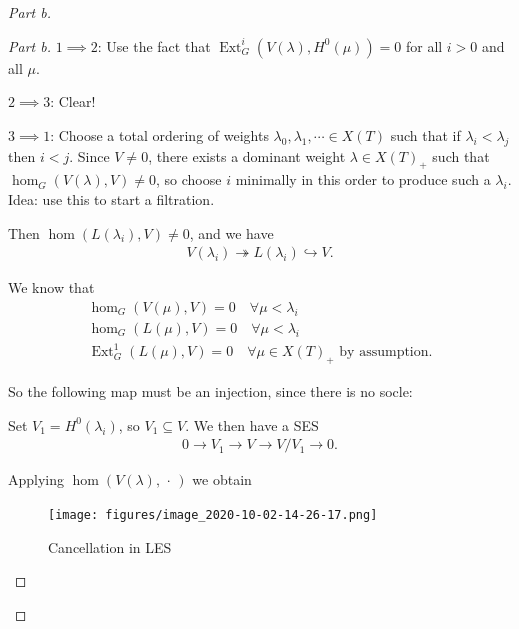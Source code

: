 \begin{proof}[Part b]

\begin{proof}[Part b]

\(1\implies 2\): Use the fact that
\(\operatorname{Ext}^i_G(V(\lambda), H^0(\mu)) = 0\) for all \(i>0\) and
all \(\mu\).

\(2\implies 3\): Clear!

\(3\implies 1\): Choose a total ordering of weights
\(\lambda_0, \lambda_1, \cdots \in X(T)\) such that if
\(\lambda_i < \lambda_j\) then \(i<j\). Since \(V\neq 0\), there exists
a dominant weight \(\lambda \in X(T)_+\) such that
\(\hom_G(V(\lambda), V) \neq 0\), so choose \(i\) minimally in this
order to produce such a \(\lambda_i\). Idea: use this to start a
filtration.

Then \(\hom(L(\lambda_i), V) \neq 0\), and we have
\begin{align*}   V(\lambda_i) \twoheadrightarrow L(\lambda_i) \hookrightarrow V .\end{align*}

We know that
\begin{align*}   \hom_G(V(\mu), V) = 0 \quad \forall \mu < \lambda_i \\ \hom_G(L(\mu), V) = 0 \quad \forall \mu < \lambda_i \\ \operatorname{Ext}_G^1(L(\mu), V) = 0 \quad \forall \mu \in X(T)_+ \text{ by assumption} .\end{align*}

So the following map must be an injection, since there is no socle:

\begin{center}
\end{center}

Set \(V_1 = H^0(\lambda_i)\), so \(V_1 \subseteq V\). We then have a SES
\begin{align*}   0 \to V_1 \to V \to V/V_1 \to 0  .\end{align*}

Applying \(\hom(V(\lambda), {\,\cdot\,})\) we obtain

\begin{figure}
\centering
\texttt{[image: figures/image\_2020-10-02-14-26-17.png]}
\caption{Cancellation in LES}
\end{figure}


\end{proof}
\end{proof}
